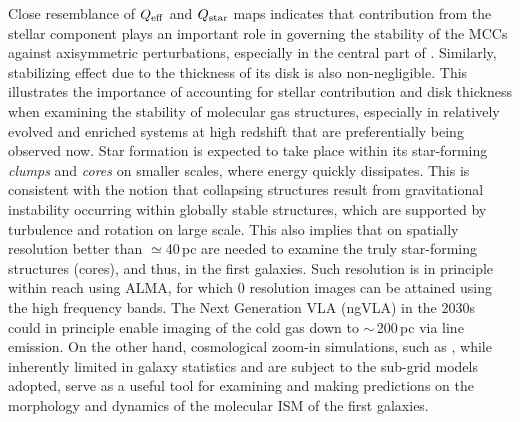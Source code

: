 \IfFileExists{emulateapjlegacy.cls}{\documentclass[iop]{emulateapjlegacy}}{\documentclass[iop]{emulateapj}}
\begin{document}
Close resemblance of $Q_{\rm eff}$ and $Q_{\rm star}$ maps indicates that contribution from the stellar component plays an important role in governing the stability of the MCCs against axisymmetric perturbations, especially in the central part of \flower. Similarly, stabilizing effect due to the thickness of its disk is also non-negligible. This illustrates the importance of accounting for stellar contribution and disk thickness when examining the stability of molecular gas structures, especially in relatively evolved and enriched systems at high redshift that are preferentially being observed now.
%
Star formation is expected to take place within its star-forming {\it clumps} and {\it cores} on smaller scales, where energy quickly dissipates. This is consistent with the notion that collapsing structures result from gravitational instability occurring within globally stable structures, which are supported by turbulence and rotation on large scale.
%
This also implies that \obs on spatially resolution better than $\simeq$40\,pc are needed to examine the truly star-forming structures (cores), and thus, \SF in the first galaxies.
%
Such resolution is in principle within reach using ALMA, for which 0 resolution images can be attained using the high frequency bands. 
The Next Generation VLA (ngVLA) in the 2030s could in principle enable imaging of the cold gas down to $\sim$\,200\,pc via \aco line emission. 
On the other hand, cosmological zoom-in simulations, such as , while inherently limited in galaxy statistics and are subject to the sub-grid models adopted, serve as a useful tool for examining and making predictions on the morphology and dynamics of the molecular ISM of the first galaxies.
\end{document}

